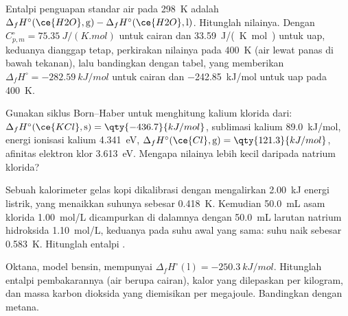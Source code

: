 \begin{exercise}[$\star\star$]\label{exo:b2:reaction-enthalpy:6}
Entalpi penguapan standar air pada \qty{298}{K} adalah
$\Delta_f H^\circ(\ce{H2O}, \text{g}) - \Delta_f H^\circ(\ce{H2O},
\text{l})$. Hitunglah nilainya. Dengan $C_{p,m}^\circ = \qty{75.35}{J/(K.mol)}$
untuk cairan dan \qty{33.59}{J/(K.mol)} untuk uap, keduanya dianggap
tetap, perkirakan nilainya pada \qty{400}{K} (air lewat panas di bawah
tekanan), lalu bandingkan dengan tabel, yang memberikan
$\Delta_f H^\circ =
\qty{-282.59}{kJ/mol}$ untuk cairan dan
\qty{-242.85}{kJ/mol} untuk uap pada \qty{400}{K}.
\end{exercise}

\begin{exercise}[$\star\star$]\label{exo:b2:reaction-enthalpy:7}
Gunakan siklus Born--Haber untuk menghitung  kalium klorida
dari: $\Delta_f H^\circ(\ce{KCl}, \text{s}) = \qty{-436.7}{kJ/mol}$,
sublimasi kalium \qty{89.0}{kJ/mol}, energi ionisasi kalium
\qty{4.341}{eV}, $\Delta_f H^\circ(\ce{Cl}, \text{g}) =
\qty{121.3}{kJ/mol}$,
afinitas elektron klor \qty{3.613}{eV}. Mengapa nilainya lebih kecil
daripada  natrium klorida?
\end{exercise}

\begin{exercise}[$\star\star$]\label{exo:b2:reaction-enthalpy:8}
Sebuah kalorimeter gelas kopi dikalibrasi dengan mengalirkan
\qty{2.00}{kJ} energi listrik, yang menaikkan suhunya sebesar
\qty{0.418}{K}. Kemudian \qty{50.0}{mL} asam klorida \qty{1.00}{mol/L}
dicampurkan di dalamnya dengan \qty{50.0}{mL} larutan natrium hidroksida
\qty{1.10}{mol/L}, keduanya pada suhu awal yang sama: suhu naik sebesar
\qty{0.583}{K}. Hitunglah entalpi .
\end{exercise}

\begin{exercise}[$\star\star$]\label{exo:b2:reaction-enthalpy:9}
Oktana, model bensin, mempunyai $\Delta_f H^\circ(\text{l}) =
\qty{-250.3}{kJ/mol}$. Hitunglah entalpi pembakarannya (air berupa
cairan), kalor yang dilepaskan per kilogram, dan massa karbon dioksida
yang diemisikan per megajoule. Bandingkan dengan metana.
\end{exercise}

